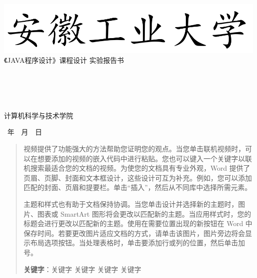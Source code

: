 \documentclass[UTF8]{ctexart}
\numberwithin{figure}{section}
\begin{document}
\begin{titlepage}
	\centering
	\vspace*{1.75cm}
	\quad\includegraphics[width= .9\textwidth]{AHUT_Logo.png}\\
	\vspace*{2cm}
	{\fontsize{20pt}\baselineskip 《JAVA程序设计》课程设计}
	\vskip 0.5cm
		{\fontsize{20pt}\baselineskip 实验报告书}
	\vskip 6cm
	\fontsize{19pt}\baselineskip
	\underline{}\\%
	\vskip 0.9cm
	\underline{}\\
	\vskip 0.9cm
	\underline{}\\
	\vskip 0.9cm
	\underline{}\\
	\vskip 0.9cm
	\underline{}\\
	\vskip 2cm
	\centerline{\large{计算机科学与技术学院}}
	\vskip 0cm
	\LARGE \textbf{\number \year }~年~\textbf{\number\month}~月~\textbf{\number\day}~日
\end{titlepage}

\begin{abstract}
	\pagestyle{plain}
	\thispagestyle{empty}
	视频提供了功能强大的方法帮助您证明您的观点。当您单击联机视频时，可以在想要添加的视频的嵌入代码中进行粘贴。您也可以键入一个关键字以联机搜索最适合您的文档的视频。为使您的文档具有专业外观，Word 提供了页眉、页脚、封面和文本框设计，这些设计可互为补充。例如，您可以添加匹配的封面、页眉和提要栏。单击“插入”，然后从不同库中选择所需元素。
	\par 主题和样式也有助于文档保持协调。当您单击设计并选择新的主题时，图片、图表或 SmartArt 图形将会更改以匹配新的主题。当应用样式时，您的标题会进行更改以匹配新的主题。使用在需要位置出现的新按钮在 Word 中保存时间。若要更改图片适应文档的方式，请单击该图片，图片旁边将会显示布局选项按钮。当处理表格时，单击要添加行或列的位置，然后单击加号。


	\textbf{关键字}：\quad 关键字 \quad 关键字 \quad 关键字 \quad 关键字
	\newpage
\end{abstract}
\end{document}
